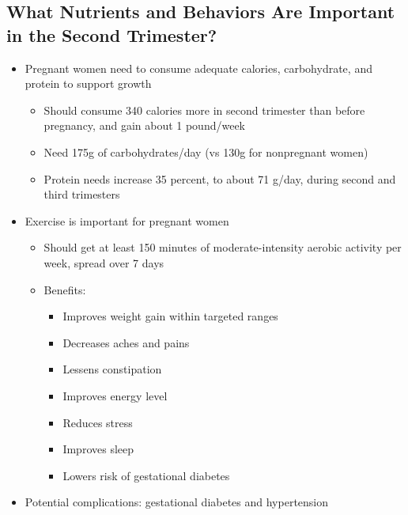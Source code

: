 \documentclass[12pt]{article}
\begin{document}
        \subsection{What Nutrients and Behaviors Are Important in the Second Trimester?}
            \begin{itemize}
                \item Pregnant women need to consume adequate calories, carbohydrate, and protein to support growth
                    \begin{itemize}
                        \item Should consume 340 calories more in second trimester than before pregnancy, and gain about 1 pound/week
                        \item Need 175g of carbohydrates/day (vs 130g for nonpregnant women)
                        \item Protein needs increase 35 percent, to about 71 g/day, during second and third trimesters
                    \end{itemize}
                \item Exercise is important for pregnant women
                    \begin{itemize}
                        \item Should get at least 150 minutes of moderate-intensity aerobic activity per week, spread over 7 days
                        \item Benefits:
                            \begin{itemize}
                                \item Improves weight gain within targeted ranges
                                \item Decreases aches and pains
                                \item Lessens constipation
                                \item Improves energy level
                                \item Reduces stress
                                \item Improves sleep
                                \item Lowers risk of gestational diabetes
                            \end{itemize}
                    \end{itemize}
                \item Potential complications: gestational diabetes and hypertension

\end{itemize}
\end{document}

